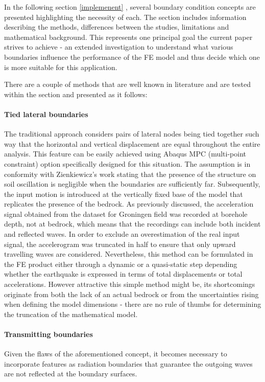 In the following section \ref{implemenent} , several boundary condition concepts are presented highlighting the necessity of each. The section includes information describing the methods, differences between the studies, limitations and mathematical background. This represents one principal goal the current paper strives to achieve - an extended investigation to understand what various boundaries influence the performance of the FE model and thus decide which one is more suitable for this application.

There are a couple of methods that are well known in literature and are tested within the section and presented as it follows: 
 \paragraph{Tied lateral boundaries}
	The traditional approach considers pairs of lateral nodes being tied together such way that the horizontal and vertical displacement are equal throughout the entire analysis. This feature can be easily achieved using Abaqus MPC (multi-point constraint) option specifically designed for this situation. The assumption is in conformity with Zienkiewicz's work stating that the presence of the structure on soil oscillation is negligible when the boundaries are sufficiently far.
	Subsequently, the input motion is introduced at the vertically fixed base of the model that replicates the presence of the bedrock. As previously discussed, the acceleration signal obtained from the dataset for Groningen field was recorded at borehole depth, not at bedrock, which means that the recordings can include both incident and reflected waves. In order to exclude an overestimation of the real input signal, the accelerogram was truncated in half to ensure that only upward travelling waves are considered.
	Nevertheless, this method can be formulated in the FE product either through a dynamic or a quasi-static step depending whether the earthquake is expressed in terms of total displacements or total accelerations.
	However attractive this simple method might be, its shortcomings originate from both the lack of an actual bedrock or from the uncertainties rising when defining the model dimensions - there are no rule of thumbs for determining the truncation of the mathematical model.
	
	\paragraph{Transmitting boundaries}
	Given the flaws of the aforementioned concept, it becomes necessary to incorporate features as radiation boundaries that guarantee the outgoing waves are not reflected at the boundary surfaces. 
	
